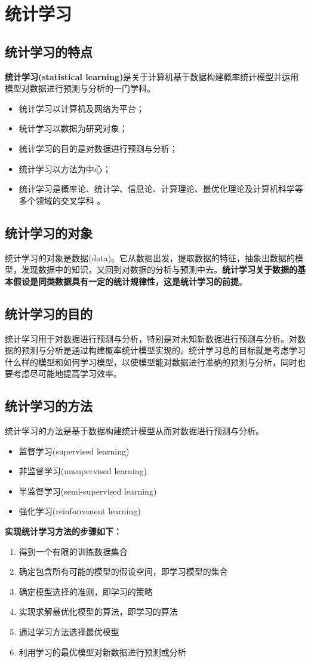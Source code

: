 \section{统计学习}

\subsection*{统计学习的特点}
\textbf{统计学习(statistical learning)}是关于计算机基于数据构建概率统计模型并运用模型对数据进行预测与分析的一门学科。
\begin{itemize}
	\item 统计学习以计算机及网络为平台；
	\item 统计学习以数据为研究对象；
	\item 统计学习的目的是对数据进行预测与分析；
	\item 统计学习以方法为中心；
	\item 统计学习是概率论、统计学、信息论、计算理论、最优化理论及计算机科学等多个领域的交叉学科 。
\end{itemize}

\subsection*{统计学习的对象}
统计学习的对象是数据(data)。它从数据出发，提取数据的特征，抽象出数据的模型，发现数据中的知识，又回到对数据的分析与预测中去。\textbf{统计学习关于数据的基本假设是同类数据具有一定的统计规律性，这是统计学习的前提}。
\subsection*{统计学习的目的}
统计学习用于对数据进行预测与分析，特别是对未知新数据进行预测与分析。对数据的预测与分析是通过构建概率统计模型实现的。统计学习总的目标就是考虑学习什么样的模型和如何学习模型，以使模型能对数据进行准确的预测与分析，同时也要考虑尽可能地提高学习效率。
\subsection*{统计学习的方法}
统计学习的方法是基于数据构建统计模型从而对数据进行预测与分析。
\begin{itemize}
	\item 监督学习(supervised learning)
	\item 非监督学习(unsupervised learning)
	\item 半监督学习(semi-supervised learning)
	\item 强化学习(reinforcement learning)
\end{itemize}
\textbf{实现统计学习方法的步骤如下：}
\begin{enumerate}[(1)]
	\item 得到一个有限的训练数据集合
	\item 确定包含所有可能的模型的假设空间，即学习模型的集合
	\item 确定模型选择的准则，即学习的策略
	\item 实现求解最优化模型的算法，即学习的算法 
	\item 通过学习方法选择最优模型
	\item 利用学习的最优模型对新数据进行预测或分析
\end{enumerate}

